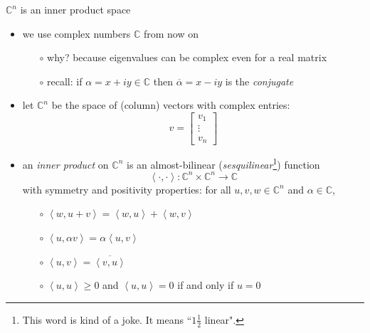 \documentclass[10pt,hyperref]{beamer}
\newcommand{\CC}{\mathbb{C}}
\newcommand{\ip}[2]{\left<#1,#2\right>}
\begin{document}
\begin{frame}{$\CC^n$ is an inner product space}

\begin{itemize}
\item we use complex numbers $\CC$ from now on
    \begin{itemize}
    \item[$\circ$] why? because eigenvalues can be complex even for a real matrix
    \item[$\circ$] recall: if $\alpha=x+iy \in \CC$ then $\overline{\alpha} = x-iy$ is the \emph{conjugate}
    \end{itemize}
\item let $\CC^n$ be the space of (column) vectors with complex entries:
\footnotesize
    $$v = \begin{bmatrix}
    v_1 \\ \vdots \\ v_n
    \end{bmatrix}$$
\normalsize
\vspace{-2mm}
\item an \emph{inner product} on $\CC^n$ is an almost-bilinear (\emph{sesquilinear}\footnote{This word is kind of a joke.  It means ``$1\frac{1}{2}$ linear".}) function
    $$\ip{\cdot}{\cdot}:\CC^n\times \CC^n \to \CC$$
with symmetry and positivity properties: \quad for all $u,v,w \in \CC^n$ and $\alpha\in \CC$,
    \begin{itemize}
    \item[$\circ$] $\ip{w}{u+v} = \ip{w}{u} + \ip{w}{v}$
    \item[$\circ$] $\ip{u}{\alpha v} = \alpha \ip{u}{v}$
    \item[$\circ$] $\ip{u}{v} = \overline{\ip{v}{u}}$
    \item[$\circ$] $\ip{u}{u} \ge 0$ and $\ip{u}{u}=0$ if and only if $u=0$
    \end{itemize}
\end{itemize}
\end{frame}
\end{document}
